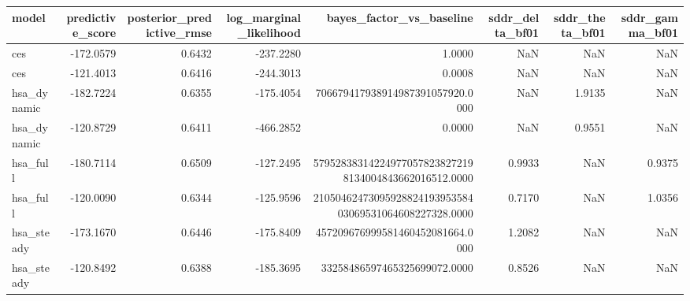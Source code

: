 \begin{tabular}{lrrrrrrr}
\toprule
model & predictive\_score & posterior\_predictive\_rmse & log\_marginal\_likelihood & bayes\_factor\_vs\_baseline & sddr\_delta\_bf01 & sddr\_theta\_bf01 & sddr\_gamma\_bf01 \\
\midrule
ces & -172.0579 & 0.6432 & -237.2280 & 1.0000 & NaN & NaN & NaN \\
ces & -121.4013 & 0.6416 & -244.3013 & 0.0008 & NaN & NaN & NaN \\
hsa\_dynamic & -182.7224 & 0.6355 & -175.4054 & 706679417938914987391057920.0000 & NaN & 1.9135 & NaN \\
hsa\_dynamic & -120.8729 & 0.6411 & -466.2852 & 0.0000 & NaN & 0.9551 & NaN \\
hsa\_full & -180.7114 & 0.6509 & -127.2495 & 579528383142249770578238272198134004843662016512.0000 & 0.9933 & NaN & 0.9375 \\
hsa\_full & -120.0090 & 0.6344 & -125.9596 & 2105046247309592882419395358403069531064608227328.0000 & 0.7170 & NaN & 1.0356 \\
hsa\_steady & -173.1670 & 0.6446 & -175.8409 & 457209676999581460452081664.0000 & 1.2082 & NaN & NaN \\
hsa\_steady & -120.8492 & 0.6388 & -185.3695 & 33258486597465325699072.0000 & 0.8526 & NaN & NaN \\
\bottomrule
\end{tabular}

